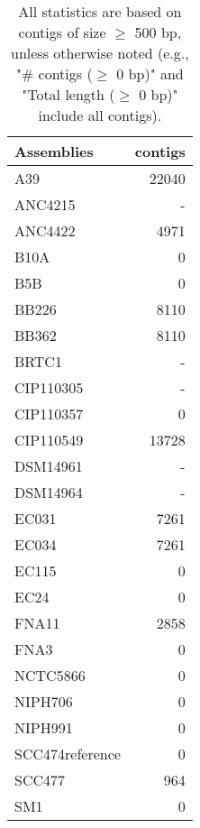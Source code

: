 \documentclass[12pt,a4paper]{article}
\begin{document}
\begin{table}[ht]
\begin{center}
\caption{All statistics are based on contigs of size $\geq$ 500 bp, unless otherwise noted (e.g., "\# contigs ($\geq$ 0 bp)" and "Total length ($\geq$ 0 bp)" include all contigs).}
\begin{tabular}{|l*{1}{|r}|}
\hline
Assemblies & contigs \\ \hline
A39 & 22040 \\ \hline
ANC4215 & - \\ \hline
ANC4422 & 4971 \\ \hline
B10A & 0 \\ \hline
B5B & 0 \\ \hline
BB226 & 8110 \\ \hline
BB362 & 8110 \\ \hline
BRTC1 & - \\ \hline
CIP110305 & - \\ \hline
CIP110357 & 0 \\ \hline
CIP110549 & 13728 \\ \hline
DSM14961 & - \\ \hline
DSM14964 & - \\ \hline
EC031 & 7261 \\ \hline
EC034 & 7261 \\ \hline
EC115 & 0 \\ \hline
EC24 & 0 \\ \hline
FNA11 & 2858 \\ \hline
FNA3 & 0 \\ \hline
NCTC5866 & 0 \\ \hline
NIPH706 & 0 \\ \hline
NIPH991 & 0 \\ \hline
SCC474reference & 0 \\ \hline
SCC477 & 964 \\ \hline
SM1 & 0 \\ \hline
\end{tabular}
\end{center}
\end{table}
\end{document}
